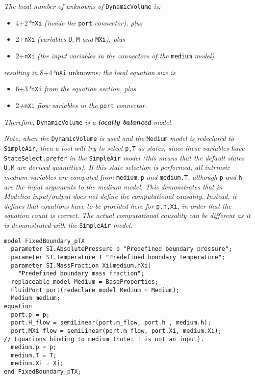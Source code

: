 \emph{The local number of unknowns of} \lstinline!DynamicVolume! \emph{is:}

\begin{itemize}
\item
  4+2\emph{*}\lstinline!nXi! \emph{(inside the} \lstinline!port! \emph{connector), plus}
\item
  2+\lstinline!nXi! \emph{(variables} \lstinline!U!\emph{,} \lstinline!M! \emph{and} \lstinline!MXi!\emph{),
  plus}
\item
  2+\lstinline!nXi! \emph{(the input variables in the connectors of the}
  \lstinline!medium! \emph{model)}
\end{itemize}

\emph{resulting in} 8+4\emph{*}\lstinline!nXi! unknowns\emph{; the local equation
size is }

\begin{itemize}
\item
  6+3\emph{*}\lstinline!nXi! \emph{from the equation section, plus}
\item
  2\emph{+}\lstinline!nXi! \emph{flow variables in the} \lstinline!port! \emph{connector. }
\end{itemize}

\emph{Therefore,} \lstinline!DynamicVolume! \emph{is a \textbf{locally balanced}
model.}

\emph{Note, when the} \lstinline!DynamicVolume! \emph{is used and the} \lstinline!Medium!
\emph{model is redeclared to} \lstinline!SimpleAir!\emph{, then a tool will try
to select} \lstinline!p,T! \emph{as states, since these variables have}
\lstinline!StateSelect.prefer! \emph{in the} \lstinline!SimpleAir! \emph{model (this means that
the default states} \lstinline!U,M! \emph{are derived quantities). If this state
selection is performed, all intrinsic medium variables are computed
from} \lstinline!medium.p! \emph{and} \lstinline!medium.T!\emph{, although}
\lstinline!p! \emph{and} \lstinline!h!
\emph{are the input arguments to the medium model. This demonstrates
that in Modelica input/output does not define the computational
causality. Instead, it defines that equations have to be provided here
for} \lstinline!p,h,Xi!\emph{, in order that the equation count is correct. The
actual computational causality can be different as it is demonstrated
with the} \lstinline!SimpleAir! \emph{model.}

\begin{lstlisting}[language=modelica]
model FixedBoundary_pTX
  parameter SI.AbsolutePressure p "Predefined boundary pressure";
  parameter SI.Temperature T "Predefined boundary temperature";
  parameter SI.MassFraction Xi[medium.nXi]
    "Predefined boundary mass fraction";
  replaceable model Medium = BaseProperties;
  FluidPort port(redeclare model Medium = Medium);
  Medium medium;
equation
  port.p = p;
  port.H_flow = semiLinear(port.m_flow, port.h , medium.h);
  port.MXi_flow = semiLinear(port.m_flow, port.Xi, medium.Xi);
// Equations binding to medium (note: T is not an input).
  medium.p = p;
  medium.T = T;
  medium.Xi = Xi;
end FixedBoundary_pTX;
\end{lstlisting}

